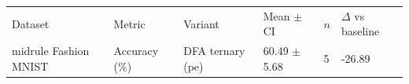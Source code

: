 \documentclass{article}
\begin{document}
\begin{tabular}{llllll}
\toprule
Dataset & Metric & Variant & Mean $\pm$ CI & $n$ & $\Delta$ vs baseline \\midrule
Fashion MNIST & Accuracy (\%) & DFA ternary (pe) & 60.49 $\pm$ 5.68 & 5 & -26.89 \
\bottomrule
\end{tabular}
\end{document}
